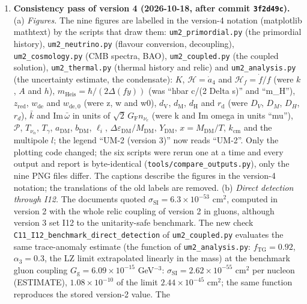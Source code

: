 \documentclass[
  10pt,
]{article}
\begin{document}
\begin{enumerate}
  version).
\item
  \textbf{Consistency pass of version 4 (2026-10-18, after commit
  \texttt{3f2d49c}).} (a) \emph{Figures.} The nine figures are labelled
  in the version-4 notation (matplotlib mathtext) by the scripts that
  draw them: \texttt{um2\_primordial.py} (the primordial history),
  \texttt{um2\_neutrino.py} (flavour conversion, decoupling),
  \texttt{um2\_cosmology.py} (CMB spectra, BAO),
  \texttt{um2\_coupled.py} (the coupled solution),
  \texttt{um2\_thermal.py} (thermal history and relic) and
  \texttt{um2\_analysis.py} (the uncertainty estimate, the condensate):
  \(K\), \(\mathcal{H} = \dot a_4\) and \(\mathcal{H}_f = \dot f/f\)
  (were \(k\), \(A\) and \(h\)),
  \(m_{\mathrm{Heis}} = \hbar/(2\Delta(fy))\) (was ``hbar c/(2 Delta
  s)'' and ``m\_H''), \(z_{\mathrm{red}}\), \(w_{\mathrm{de}}\) and
  \(w_{\mathrm{de},0}\) (were z, w and w0), \(d_{\mathrm{V}}\),
  \(d_{\mathrm{M}}\), \(d_{\mathrm{H}}\) and \(r_{\mathrm{d}}\) (were
  \(D_V\), \(D_M\), \(D_H\), \(r_d\)), \(\bar k\) and
  \(\mathrm{Im}\,\bar\omega\) in units of
  \(\sqrt2\,G_{\mathrm{F}}n_{\nu_e}\) (were k and Im omega in units
  ``mu''), \(\mathcal{P}\), \(T_{\nu_\alpha}\), \(T_\gamma\),
  \(a_{\mathrm{DM}}\), \(b_{\mathrm{DM}}\), \(\ell_i\),
  \(\Delta\varepsilon_{\mathrm{DM}}/M_{\mathrm{DM}}\),
  \(Y_{\mathrm{DM}}\), \(x = M_{\mathrm{DM}}/T\), \(k_{\mathrm{cm}}\)
  and the multipole \(l\); the legend ``UM-2 (version 3)'' now reads
  ``UM-2''. Only the plotting code changed; the six scripts were rerun
  one at a time and every output and report is byte-identical
  (\texttt{tools/compare\_outputs.py}), only the nine PNG files differ.
  The captions describe the figures in the version-4 notation; the
  translations of the old labels are removed. (b) \emph{Direct detection
  through I12.} The documents quoted
  \(\sigma_{\mathrm{SI}} = 6.3\times10^{-53}\) cm\(^2\), computed in
  version 2 with the whole relic coupling of version 2 in gluons,
  although version 3 set I12 to the unitarity-safe benchmark. The new
  check \texttt{C11\_I12\_benchmark\_direct\_detection} of
  \texttt{um2\_coupled.py} evaluates the same trace-anomaly estimate
  (the function of \texttt{um2\_analysis.py}:
  \(f_{\mathrm{TG}} = 0.92\), \(\alpha_3 = 0.3\), the LZ limit
  extrapolated linearly in the mass) at the benchmark gluon coupling
  \(G_{\mathrm{g}} = 6.09\times10^{-15}\) GeV\(^{-3}\):
  \(\sigma_{\mathrm{SI}} = 2.62\times10^{-55}\) cm\(^2\) per nucleon
  (ESTIMATE), \(1.08\times10^{-10}\) of the limit \(2.44\times10^{-45}\)
  cm\(^2\); the same function reproduces the stored version-2 value. The

\end{enumerate}
\end{document}
